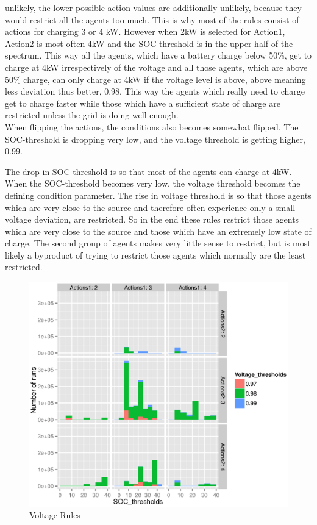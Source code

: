 \documentclass[a4paper]{article}
\begin{document}
unlikely, the lower possible action values are additionally unlikely, because they would restrict all the agents too much. This is why 
most of the rules  consist of actions for charging 3 or 4 kW. However when 2kW is selected for Action1, Action2 is most often 4kW and 
the SOC-threshold is in the upper half of the spectrum. This way all the agents, which have a battery charge below 50\%, get to 
charge at 4kW irrespectively of the voltage and all those agents, which are above 50\% charge, can only charge at 4kW if the voltage 
level is above, above meaning less deviation thus better, 0.98. This way the agents which really need to charge get to charge faster 
while those which have a sufficient state of charge are restricted unless the grid is doing well enough. \\
When flipping the actions, the conditions also becomes somewhat flipped. The SOC-threshold is dropping very low, and the voltage threshold
is getting higher, 0.99. 

The drop in SOC-threshold is so that most of the agents can charge at 4kW. When the SOC-threshold becomes very low, the voltage
threshold becomes the defining condition parameter. 
The rise in voltage threshold 
is so that those agents which are very close to the source and therefore often experience only a small voltage deviation, are restricted. 
So in the end these rules restrict those agents which are very close to the source and those which have an extremely low state of 
charge. The second group of agents makes very little sense to restrict, but is most likely a byproduct of trying to restrict those 
agents which normally are the least restricted. 

\begin{figure}
\centering
 \includegraphics[width = \textwidth]{rules_voltage_soc_first_look.eps}
 \caption{Voltage Rules}
 \label{colored_rules}
\end{figure}
\end{document}
